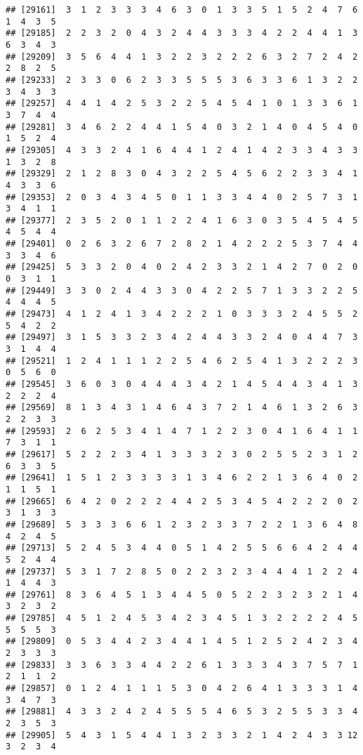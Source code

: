 \documentclass[
]{article}
\begin{document}
\begin{verbatim}
## [29161]  3  1  2  3  3  3  4  6  3  0  1  3  3  5  1  5  2  4  7  6  1  4  3  5
## [29185]  2  2  3  2  0  4  3  2  4  4  3  3  3  4  2  2  4  4  1  3  6  3  4  3
## [29209]  3  5  6  4  4  1  3  2  2  3  2  2  2  6  3  2  7  2  4  2  2  8  2  5
## [29233]  2  3  3  0  6  2  3  3  5  5  5  3  6  3  3  6  1  3  2  2  3  4  3  3
## [29257]  4  4  1  4  2  5  3  2  2  5  4  5  4  1  0  1  3  3  6  1  3  7  4  4
## [29281]  3  4  6  2  2  4  4  1  5  4  0  3  2  1  4  0  4  5  4  0  1  5  2  4
## [29305]  4  3  3  2  4  1  6  4  4  1  2  4  1  4  2  3  3  4  3  3  1  3  2  8
## [29329]  2  1  2  8  3  0  4  3  2  2  5  4  5  6  2  2  3  3  4  1  4  3  3  6
## [29353]  2  0  3  4  3  4  5  0  1  1  3  3  4  4  0  2  5  7  3  1  3  4  1  1
## [29377]  2  3  5  2  0  1  1  2  2  4  1  6  3  0  3  5  4  5  4  5  4  5  4  4
## [29401]  0  2  6  3  2  6  7  2  8  2  1  4  2  2  2  5  3  7  4  4  3  3  4  6
## [29425]  5  3  3  2  0  4  0  2  4  2  3  3  2  1  4  2  7  0  2  0  0  3  1  1
## [29449]  3  3  0  2  4  4  3  3  0  4  2  2  5  7  1  3  3  2  2  5  4  4  4  5
## [29473]  4  1  2  4  1  3  4  2  2  2  1  0  3  3  3  2  4  5  5  2  5  4  2  2
## [29497]  3  1  5  3  3  2  3  4  2  4  4  3  3  2  4  0  4  4  7  3  3  1  4  4
## [29521]  1  2  4  1  1  1  2  2  5  4  6  2  5  4  1  3  2  2  2  3  0  5  6  0
## [29545]  3  6  0  3  0  4  4  4  3  4  2  1  4  5  4  4  3  4  1  3  2  2  2  4
## [29569]  8  1  3  4  3  1  4  6  4  3  7  2  1  4  6  1  3  2  6  3  2  2  3  3
## [29593]  2  6  2  5  3  4  1  4  7  1  2  2  3  0  4  1  6  4  1  1  7  3  1  1
## [29617]  5  2  2  2  3  4  1  3  3  3  2  3  0  2  5  5  2  3  1  2  6  3  3  5
## [29641]  1  5  1  2  3  3  3  3  1  3  4  6  2  2  1  3  6  4  0  2  1  1  5  1
## [29665]  6  4  2  0  2  2  2  4  4  2  5  3  4  5  4  2  2  2  0  2  3  1  3  3
## [29689]  5  3  3  3  6  6  1  2  3  2  3  3  7  2  2  1  3  6  4  8  4  2  4  5
## [29713]  5  2  4  5  3  4  4  0  5  1  4  2  5  5  6  6  4  2  4  4  5  2  4  4
## [29737]  5  3  1  7  2  8  5  0  2  2  3  2  3  4  4  4  1  2  2  4  1  4  4  3
## [29761]  8  3  6  4  5  1  3  4  4  5  0  5  2  2  3  2  3  2  1  4  3  2  3  2
## [29785]  4  5  1  2  4  5  3  4  2  3  4  5  1  3  2  2  2  2  4  5  5  5  5  3
## [29809]  0  5  3  4  4  2  3  4  4  1  4  5  1  2  5  2  4  2  3  4  2  3  3  3
## [29833]  3  3  6  3  3  4  4  2  2  6  1  3  3  3  4  3  7  5  7  1  2  1  1  2
## [29857]  0  1  2  4  1  1  1  5  3  0  4  2  6  4  1  3  3  3  1  4  3  4  7  3
## [29881]  4  3  3  2  4  2  4  5  5  5  4  6  5  3  2  5  5  3  3  4  2  3  5  3
## [29905]  5  4  3  1  5  4  4  1  3  2  3  3  2  1  4  2  4  3  3 12  3  2  3  4

\end{verbatim}
\end{document}
